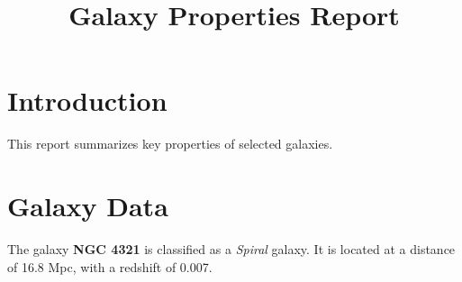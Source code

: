 \documentclass{article}
\title{Galaxy Properties Report}
\author{}
\date{}
\begin{document}
\maketitle

\section{Introduction}
This report summarizes key properties of selected galaxies.

\section{Galaxy Data}
The galaxy \textbf{NGC 4321} is classified as a \textit{Spiral} galaxy. 
It is located at a distance of 16.8 Mpc, with a redshift of 0.007.
\end{document}

